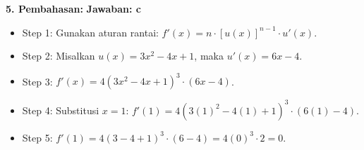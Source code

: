\documentclass[12pt,a4paper]{article}
\begin{document}
\textbf{5. Pembahasan:} \hfill \textbf{Jawaban: c}
\begin{itemize}
    \item Step 1: Gunakan aturan rantai: $f'(x) = n \cdot [u(x)]^{n-1} \cdot u'(x)$.
    \item Step 2: Misalkan $u(x) = 3x^2 - 4x + 1$, maka $u'(x) = 6x - 4$.
    \item Step 3: $f'(x) = 4(3x^2 - 4x + 1)^3 \cdot (6x - 4)$.
    \item Step 4: Substitusi $x = 1$: $f'(1) = 4(3(1)^2 - 4(1) + 1)^3 \cdot (6(1) - 4)$.
    \item Step 5: $f'(1) = 4(3 - 4 + 1)^3 \cdot (6 - 4) = 4(0)^3 \cdot 2 = 0$.
\end{itemize}
\end{document}
